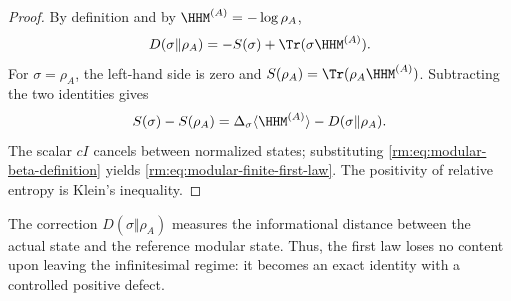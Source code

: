 \begin{proof}
By definition and by \(\HHM^{(A)}=-\log\rho_A\),
\[
D(\sigma\Vert\rho_A)
=-S(\sigma)+\Tr(\sigma\HHM^{(A)}).
\]
For \(\sigma=\rho_A\), the left-hand side is zero and
\(S(\rho_A)=\Tr(\rho_A\HHM^{(A)})\). Subtracting the two identities gives
\[
S(\sigma)-S(\rho_A)
=\Delta_\sigma\langle\HHM^{(A)}\rangle
-D(\sigma\Vert\rho_A).
\]
The scalar \(cI\) cancels between normalized states; substituting
\cref{rm:eq:modular-beta-definition} yields
\cref{rm:eq:modular-finite-first-law}. The positivity of relative entropy
is Klein's inequality.
\end{proof}

The correction \(D(\sigma\Vert\rho_A)\) measures the informational distance
between the actual state and the reference modular state. Thus, the first
law loses no content upon leaving the infinitesimal regime: it becomes
an exact identity with a controlled positive defect.
